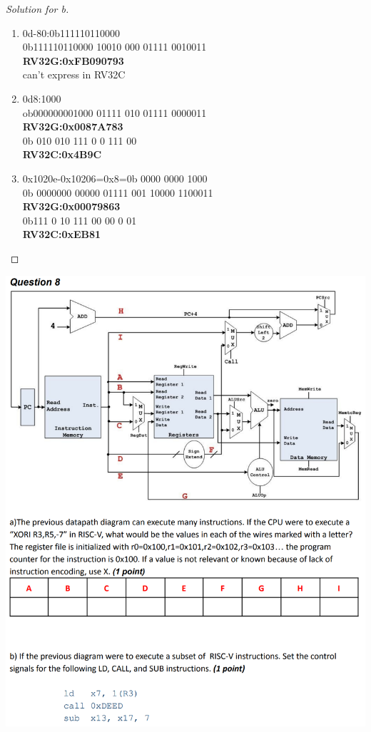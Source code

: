 \documentclass[12pt]{article}
\begin{document}
\begin{proof}[Solution for b]
	\ \\
	\begin{enumerate}
		\item 0d-80:0b111110110000\\
		0b111110110000 10010 000 01111 0010011\\
		\textbf{RV32G:0xFB090793}\\
		can't express in RV32C
		\item 0d8:1000\\
		ob000000001000 01111 010 01111 0000011\\
		\textbf{RV32G:0x0087A783}\\
		0b 010 010 111 0 0 111 00\\
		\textbf{RV32C:0x4B9C}
		\item 0x1020e-0x10206=0x8=0b 0000 0000 1000\\
		0b 0000000 00000 01111 001 10000 1100011\\
		\textbf{RV32G:0x00079863}\\
		0b111 0 10 111 00 00 0 01\\
		\textbf{RV32C:0xEB81}
	\end{enumerate}
\end{proof}
\includegraphics[scale=0.35]{8.png}
\end{document}
